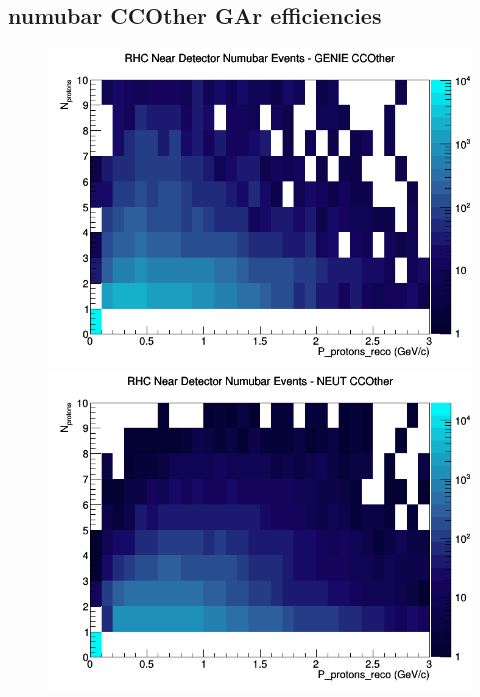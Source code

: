 \subsection{numubar CCOther GAr efficiencies}
\begin{figure}[h]
\includegraphics[width=\linewidth]{eff_N_P/GAr/protons/CCOther_RHC_ND_numubar_N_P_GENIE.png}
\endminipage
{}
\includegraphics[width=\linewidth]{eff_N_P/GAr/protons/CCOther_RHC_ND_numubar_N_P_NEUT.png}
\endminipage
{}

\end{figure}
